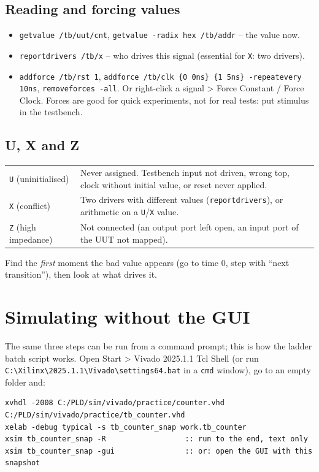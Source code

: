 \documentclass[11pt,a4paper]{article}
\newcommand{\code}[1]{\texttt{#1}}
\newcommand{\bs}{\textbackslash\allowbreak{}}
\renewcommand{\_}{\oldunderscore\allowbreak{}}
\newcommand{\menu}[1]{\textsf{#1}}
\begin{document}
\subsection{Reading and forcing values}
\begin{itemize}[nosep]
  \item \code{get\_value /tb/uut/cnt}, \code{get\_value -radix hex /tb/addr} -- the value now.
  \item \code{report\_drivers /tb/x} -- who drives this signal (essential for \code{X}: two drivers).
  \item \code{add\_force /tb/rst 1}, \code{add\_force /tb/clk \{0 0ns\} \{1 5ns\} -repeat\_every 10ns}, \code{remove\_forces -all}. Or right-click a signal \menu{> Force Constant / Force Clock}. Forces are good for quick experiments, not for real tests: put stimulus in the testbench.
\end{itemize}

\subsection{U, X and Z}
\begin{tabularx}{\textwidth}{@{}lY@{}}
\toprule
\code{U} (uninitialised) & Never assigned. Testbench input not driven, wrong top, clock without initial value, or reset never applied. \\
\code{X} (conflict) & Two drivers with different values (\code{report\_drivers}), or arithmetic on a \code{U}/\code{X} value. \\
\code{Z} (high impedance) & Not connected (an output port left open, an input port of the UUT not mapped). \\
\bottomrule
\end{tabularx}
Find the \emph{first} moment the bad value appears (go to time 0, step with ``next transition''), then look at what drives it.

\section{Simulating without the GUI}\label{sec:batch}
The same three steps can be run from a command prompt; this is how the ladder batch script works. Open \menu{Start > Vivado 2025.1.1 Tcl Shell} (or run \code{C:\bs Xilinx\bs 2025.1.1\bs Vivado\bs settings64.bat} in a \code{cmd} window), go to an empty folder and:
\begin{lstlisting}
xvhdl -2008 C:/PLD/sim/vivado/practice/counter.vhd C:/PLD/sim/vivado/practice/tb_counter.vhd
xelab -debug typical -s tb_counter_snap work.tb_counter
xsim tb_counter_snap -R                  :: run to the end, text only
xsim tb_counter_snap -gui                :: or: open the GUI with this snapshot
\end{lstlisting}
\end{document}
